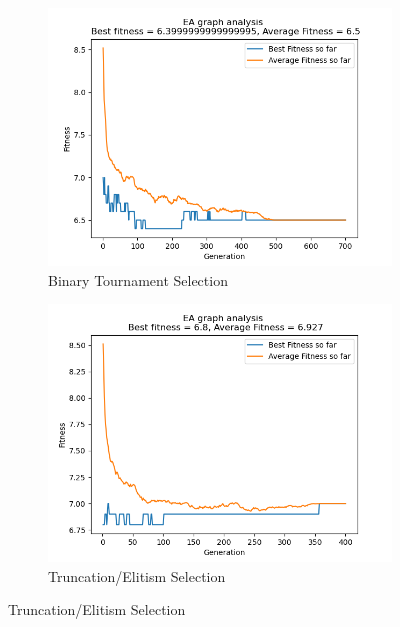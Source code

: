 \documentclass[conference,compsoc]{IEEEtran}
\begin{document}
\begin{figure}[h]
\begin{subfigure}{0.34\textwidth}
    \includegraphics[width=\linewidth]{../Results/_11_BT_Truncation_100_50_700.png}
    \caption{Binary Tournament Selection}
  \end{subfigure}
  \begin{subfigure}{0.34\textwidth}
    \includegraphics[width=\linewidth]{../Results/_11_Truncation_Truncation_100_50_400.png}
    \caption{Truncation/Elitism Selection}
  \end{subfigure}
  \label{fig:graphs1}
\end{figure}
\end{document}
